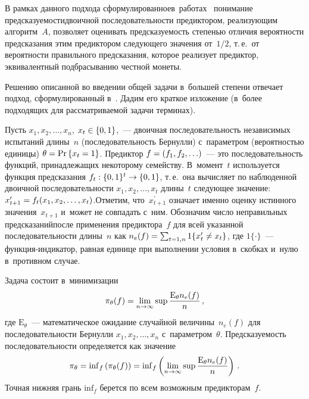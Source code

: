 \begin{multicols}{2}
  В рамках данного подхода сформулированное\linebreak в~работах~\cite{10-fr, 11-fr} 
понимание предсказуемости\linebreak двоичной последовательности предиктором, 
реализующим алгоритм~$A$, позволяет оценивать предсказуемость 
степенью отличия вероятности предсказания этим предиктором следующего 
значения от~$1/2$, т.\,е.\ от вероятности правильного предсказания, которое 
реализует предиктор, эквивалентный подбрасыванию честной монеты.
  
  Решению описанной во введении общей задачи в~большей степени 
отвечает подход, сформулированный в~\cite{6-fr}. Дадим его краткое 
изложение (в~более подходящих для рассматриваемой задачи терминах).
  
  Пусть $x_1, x_2, \ldots , x_n$, $x_t\hm\in \{0,1\}$,~--- двоичная 
последовательность независимых испытаний длины~$n$ 
(последовательность Бернулли) с~параметром (вероятностью единицы) 
$\theta\hm = \mathrm{Pr}\left\{x_t=1\right\}$. Предиктор $f\hm = (f_1, f_2, 
\ldots)$~--- это последовательность функций, принадлежащих некоторому 
семейству. В~момент~$t$ используется функция предсказания $f_t: \{0,1\}^t 
\hm\to \{0,1\}$, т.\,е.\ она вычисляет по наблюденной двоичной 
последовательности $x_1, x_2, \ldots , x_t$ длины~$t$ следующее значение: 
$x^\prime_{t+1}\hm= f_t(x_1, x_2, \ldots , x_t)$.\linebreak Отметим, что~$x^\prime_{t+1}$ 
означает именно оценку истинного значения~$x_{t+1}$ и~может не совпадать 
с~ним. Обозначим число неправильных предсказаний\linebreak после применения 
предиктора~$f$ для всей указанной последовательности длины~$n$ как 
$n_e(f)\hm = \sum\nolimits_{t=1,n} 1\{ x^\prime_t \not= x_t\}$, где 
$1\{\cdot\}$~---  
функ\-ция-ин\-ди\-ка\-тор, равная единице при выполнении условия 
в~скобках и~нулю в~противном случае.
  
  Задача состоит в~минимизации 
  $$
  \pi_\theta (f)= \lim\limits_{n\to\infty} 
\mathrm{sup}\,\displaystyle\frac{\displaystyle \mathrm{E}_\theta n_e(f)\mathstrut}{\displaystyle n\mathstrut}\,,
$$
 где $\mathrm{E}_\theta$~--- 
математическое ожидание случайной величины~$n_e(f)$ для 
последовательности Бернулли $x_1, x_2, \ldots , x_n$ с~параметром~$\theta$. 
Предсказуемость последовательности определяется как значение
  \begin{equation}
  \pi_\theta = \mathop{\mathrm{inf}}\nolimits_f \left( \pi_\theta (f)\right) = 
\mathop{\mathrm{inf}}\nolimits_f \left( \lim\limits_{n\to\infty} 
\mathrm{sup}\,\displaystyle\frac{\displaystyle \mathrm{E}_\theta n_e(f)\mathstrut}{\displaystyle n\mathstrut}\right)\,.
  \label{e1-fr}
  \end{equation}
  Точная нижняя грань $\mathrm{inf}_f$ берется по всем возможным 
предикторам~$f$.
   

\end{multicols}
